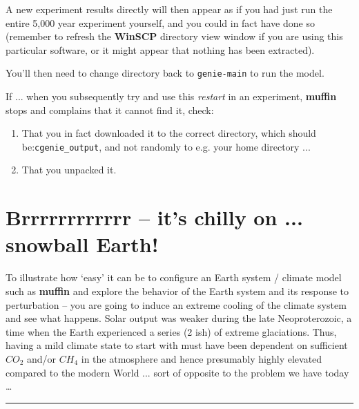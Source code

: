 \documentclass[11pt,fleqn]{book} %
\begin{document}
A new experiment results directly will then appear as if you had just run the entire 5,000 year experiment yourself, and you could in fact have done so (remember to refresh the \textbf{WinSCP} directory view window if you are using this particular software, or it might appear that nothing has been extracted).

You’ll then need to change directory back to \texttt{genie-main} to run the model.

If ... when you subsequently try and use this \textit{restart} in an experiment, \textbf{muffin} stops and complains that it cannot find it, check:
\begin{enumerate}[noitemsep]
\vspace{1mm}
\item That you in fact downloaded it to the correct directory, which should be:\texttt{cgenie\_output}, and not randomly to e.g. your home directory ...
\vspace{1mm} 
\item That you unpacked it.
\end{enumerate}


\newpage


\section{Brrrrrrrrrrrr – it’s chilly on ... snowball Earth!}

To illustrate how ‘easy’ it can be to configure an Earth system / climate model such as \textbf{muffin} and explore the behavior of the Earth system and its response to perturbation – you are going to induce an extreme cooling of the climate system and see what happens. Solar output was weaker during the late Neoproterozoic, a time when the Earth experienced a series (2 ish) of extreme glaciations. Thus, having a mild climate state to start with must have been dependent on sufficient \(CO_{2}\) and/or \(CH_{4}\) in the atmosphere and hence presumably highly elevated compared to the modern World ... sort of opposite to the problem we have today …

\vspace{1mm}
\noindent\rule{4cm}{0.5pt}
\vspace{2mm}
\end{document}
